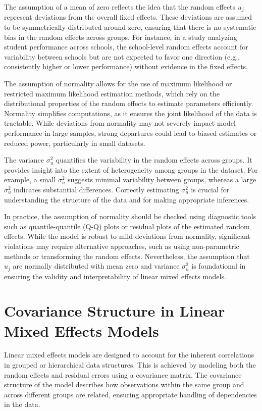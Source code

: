 The assumption of a mean of zero reflects the idea that the random effects $u_j$ represent deviations from the overall fixed effects. These deviations are assumed to be symmetrically distributed around zero, ensuring that there is no systematic bias in the random effects across groups. For instance, in a study analyzing student performance across schools, the school-level random effects account for variability between schools but are not expected to favor one direction (e.g., consistently higher or lower performance) without evidence in the fixed effects.

The assumption of normality allows for the use of maximum likelihood or restricted maximum likelihood estimation methods, which rely on the distributional properties of the random effects to estimate parameters efficiently. Normality simplifies computations, as it ensures the joint likelihood of the data is tractable. While deviations from normality may not severely impact model performance in large samples, strong departures could lead to biased estimates or reduced power, particularly in small datasets.

The variance $\sigma_u^2$ quantifies the variability in the random effects across groups. It provides insight into the extent of heterogeneity among groups in the dataset. For example, a small $\sigma_u^2$ suggests minimal variability between groups, whereas a large $\sigma_u^2$ indicates substantial differences. Correctly estimating $\sigma_u^2$ is crucial for understanding the structure of the data and for making appropriate inferences.

In practice, the assumption of normality should be checked using diagnostic tools such as quantile-quantile (Q-Q) plots or residual plots of the estimated random effects. While the model is robust to mild deviations from normality, significant violations may require alternative approaches, such as using non-parametric methods or transforming the random effects. Nevertheless, the assumption that $u_j$ are normally distributed with mean zero and variance $\sigma_u^2$ is foundational in ensuring the validity and interpretability of linear mixed effects models.

\section{Covariance Structure in Linear Mixed Effects Models}

Linear mixed effects models are designed to account for the inherent correlations in grouped or hierarchical data structures. This is achieved by modeling both the random effects and residual errors using a covariance matrix. The covariance structure of the model describes how observations within the same group and across different groups are related, ensuring appropriate handling of dependencies in the data.

